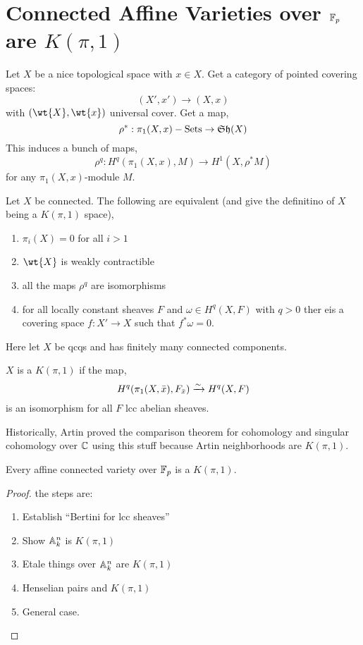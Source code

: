 \documentclass[12pt]{article}
\begin{document}
\section{Connected Affine Varieties over $\mathbb{F}_p$ are $K(\pi, 1)$}


Let $X$ be a nice topological space with $x \in X$. Get a category of pointed covering spaces:
\[ (X', x') \to (X, x) \]
with $(\wt{X}, \wt{x})$ universal cover. Get a map,
\[ \rho^* : \pi_1(X, x)-\text{Sets} \to \mathfrak{Sh}(X) \]
This induces a bunch of maps,
\[ \rho^q : H^q(\pi_1(X, x), M) \to H^1(X, \rho^* M) \]
for any $\pi_1(X, x)$-module $M$. 

\begin{prop}
Let $X$ be connected.
The following are equivalent (and give the definitino of $X$ being a $K(\pi, 1)$ space),
\begin{enumerate}
\item $\pi_i(X) = 0$ for all $i > 1$
\item $\wt{X}$ is weakly contractible
\item all the maps $\rho^q$ are isomorphisms
\item for all locally constant sheaves $F$ and $\omega \in H^q(X, F)$ with $q > 0$ ther eis a covering space $f : X' \to X$ such that $f^* \omega = 0$.
\end{enumerate}
\end{prop}

Here let $X$ be qcqs and has finitely many connected components. 

\begin{defn}
$X$ is a $K(\pi, 1)$ if the map,
\[ H^q(\pi_1(X, \bar{x}), F_{\bar{x}}) \xrightarrow{\sim} H^q(X, F) \]
is an isomorphism for all $F$ lcc abelian sheaves. 
\end{defn}

\begin{rmk}
Historically, Artin proved the comparison theorem for \etale cohomology and singular cohomology over $\mathbb{C}$ using this stuff because Artin neighborhoods are $K(\pi, 1)$. 
\end{rmk}

\begin{theorem}
Every affine connected variety over $\mathbb{F}_p$ is a $K(\pi, 1)$. 
\end{theorem}

\begin{proof}
the steps are:
\begin{enumerate}
\item Establish ``Bertini for lcc sheaves''
\item Show $\mathbb{A}^n_k$ is $K(\pi, 1)$
\item Etale things over $\mathbb{A}^n_k$ are $K(\pi, 1)$
\item Henselian pairs and $K(\pi, 1)$
\item General case.
\end{enumerate}
\end{proof}
\end{document}
